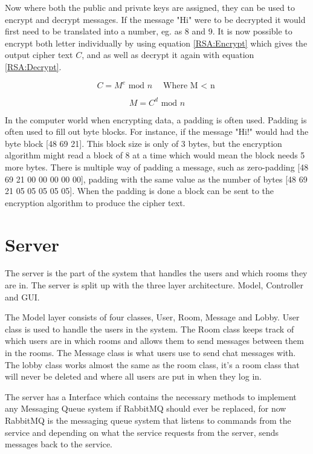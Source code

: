 Now where both the public and private keys are assigned, they can be used to encrypt and decrypt messages. If the message "Hi" were to be decrypted it would first need to be translated into a number, eg. as 8 and 9. It is now possible to encrypt both letter individually by using equation \ref{RSA:Encrypt} which gives the output cipher text $C$, and as well as decrypt it again with equation \ref{RSA:Decrypt}.

\begin{equation}
C=M^e \textrm{ mod } n \quad \textrm{Where M $<$ n}
\label{RSA:Encrypt}
\end{equation}

\begin{equation}
M=C^d \textrm{ mod } n
\label{RSA:Decrypt}
\end{equation}

In the computer world when encrypting data, a padding is often used. Padding is often used to fill out byte blocks. For instance, if the message "Hi!" would had the byte block [48 69 21]. This block size is only of 3 bytes, but the encryption algorithm might read a block of 8 at a time which would mean the block needs 5 more bytes. There is multiple way of padding a message, such as zero-padding [48 69 21 00 00 00 00 00], padding with the same value as the number of bytes [48 69 21 05 05 05 05 05]\cite{PADDING}. When the padding is done a block can be sent to the encryption algorithm to produce the cipher text.

\section{Server}

The server is the part of the system that handles the users and which rooms they are in. The server is split up with the three layer architecture. Model, Controller and GUI. 

The Model layer consists of four classes, User, Room, Message and Lobby. User class is used to handle the users in the system. The Room class keeps track of which users are in which rooms and allows them to send messages between them in the rooms. The Message class is what users use to send chat messages with. The lobby class works almost the same as the room class, it's a room class that will never be deleted and where all users are put in when they log in.


The server has a Interface which contains the necessary methods to implement any Messaging Queue system if RabbitMQ should ever be replaced, for now RabbitMQ is the messaging queue system that listens to commands from the service and depending on what the service requests from the server, sends messages back to the service.


